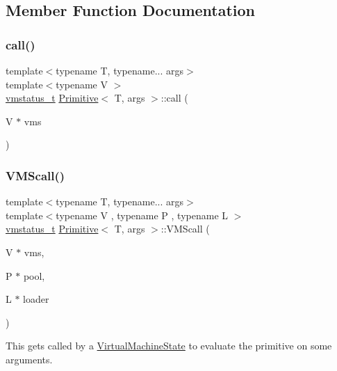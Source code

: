 \subsection{Member Function Documentation}
\mbox{\label{struct_primitive_aa776657a1c5101422799c33a8d2cfaef}} 
\subsubsection{\texorpdfstring{call()}{call()}}
{\footnotesize\ttfamily template$<$typename T, typename... args$>$ \\
template$<$typename V $>$ \\
\hyperlink{_instruction_8h_a6202215407ab29590bb936ca2996cf64}{vmstatus\+\_\+t} \hyperlink{struct_primitive}{Primitive}$<$ T, args $>$\+::call (\begin{DoxyParamCaption}\item[{V $\ast$}]{vms }\end{DoxyParamCaption})\hspace{0.3cm}{\ttfamily [inline]}}

\mbox{\label{struct_primitive_a10cedec90ed4a3ff01be2bd3b9c36528}} 
\subsubsection{\texorpdfstring{V\+M\+Scall()}{VMScall()}}
{\footnotesize\ttfamily template$<$typename T, typename... args$>$ \\
template$<$typename V , typename P , typename L $>$ \\
\hyperlink{_instruction_8h_a6202215407ab29590bb936ca2996cf64}{vmstatus\+\_\+t} \hyperlink{struct_primitive}{Primitive}$<$ T, args $>$\+::V\+M\+Scall (\begin{DoxyParamCaption}\item[{V $\ast$}]{vms,  }\item[{P $\ast$}]{pool,  }\item[{L $\ast$}]{loader }\end{DoxyParamCaption})\hspace{0.3cm}{\ttfamily [inline]}}



This gets called by a \hyperlink{class_virtual_machine_state}{Virtual\+Machine\+State} to evaluate the primitive on some arguments. 


